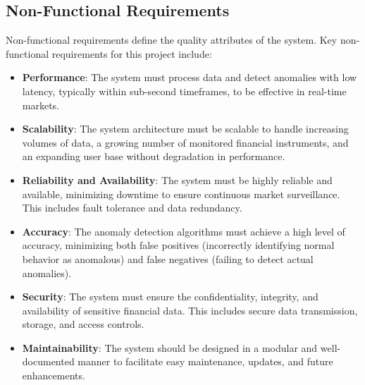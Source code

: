 \subsection{Non-Functional Requirements}
Non-functional requirements define the quality attributes of the system. Key non-functional requirements for this project include:
\begin{itemize}
    \item \textbf{Performance}: The system must process data and detect anomalies with low latency, typically within sub-second timeframes, to be effective in real-time markets.
    \item \textbf{Scalability}: The system architecture must be scalable to handle increasing volumes of data, a growing number of monitored financial instruments, and an expanding user base without degradation in performance.
    \item \textbf{Reliability and Availability}: The system must be highly reliable and available, minimizing downtime to ensure continuous market surveillance. This includes fault tolerance and data redundancy.
    \item \textbf{Accuracy}: The anomaly detection algorithms must achieve a high level of accuracy, minimizing both false positives (incorrectly identifying normal behavior as anomalous) and false negatives (failing to detect actual anomalies).
    \item \textbf{Security}: The system must ensure the confidentiality, integrity, and availability of sensitive financial data. This includes secure data transmission, storage, and access controls.
    \item \textbf{Maintainability}: The system should be designed in a modular and well-documented manner to facilitate easy maintenance, updates, and future enhancements.
\end{itemize}





